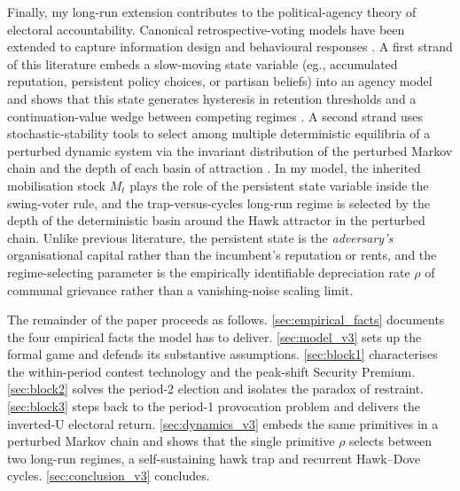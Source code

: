 \documentclass[11pt,twoside]{extarticle}
\begin{document}
Finally, my long-run extension contributes to the political-agency theory of electoral accountability. Canonical retrospective-voting models \citep*{barroControlPoliticiansEconomic1973,ferejohnIncumbentPerformanceElectoral1986} have been extended to capture information design \citep*{banksRepeatedElectionsModel1993,przeworskiDemocracyAccountabilityRepresentation1999,sandroniWhenConfrontRole2018a,acharyaPoliticalAccountabilityMoral2025} and behavioural responses \citep*{levyCorrelationNeglectVoting2015,ortolevaOverconfidencePoliticalBehavior2015,liElectoralAccountabilitySelection2023,vaethVoterLearningUnidimensional2023}. A first strand of this literature embeds a slow-moving state variable (eg., accumulated reputation, persistent policy choices, or partisan beliefs) into an agency model and shows that this state generates hysteresis in retention thresholds and a continuation-value wedge between competing regimes \citep*{coatePolicyPersistence1999,padróimiquelControlPoliticiansDivided2007}. A second strand uses stochastic-stability tools to select among multiple deterministic equilibria of a perturbed dynamic system via the invariant distribution of the perturbed Markov chain and the depth of each basin of attraction \citep*{youngIndividualStrategySocial2020,kandoriLearningMutationLong1993a,meynMarkovChainsStochastic2012}. In my model, the inherited mobilisation stock $M_t$ plays the role of the persistent state variable inside the swing-voter rule, and the trap-versus-cycles long-run regime is selected by the depth of the deterministic basin around the Hawk attractor in the perturbed chain. Unlike previous literature, the persistent state is the \emph{adversary's} organisational capital rather than the incumbent's reputation or rents, and the regime-selecting parameter is the empirically identifiable depreciation rate $\rho$ of communal grievance rather than a vanishing-noise scaling limit.


The remainder of the paper proceeds as follows. \autoref{sec:empirical_facts} documents the four empirical facts the model has to deliver. \autoref{sec:model_v3} sets up the formal game and defends its substantive assumptions. \autoref{sec:block1} characterises the within-period contest technology and the peak-shift Security Premium. \autoref{sec:block2} solves the period-2 election and isolates the paradox of restraint. \autoref{sec:block3} steps back to the period-1 provocation problem and delivers the inverted-U electoral return. \autoref{sec:dynamics_v3} embeds the same primitives in a perturbed Markov chain and shows that the single primitive $\rho$ selects between two long-run regimes, a self-sustaining hawk trap and recurrent Hawk--Dove cycles. \autoref{sec:conclusion_v3} concludes.
\end{document}
